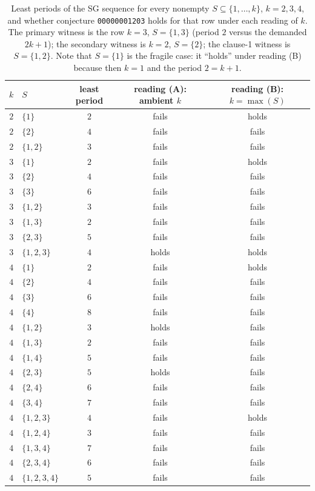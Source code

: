 \documentclass[11pt]{article}
\theoremstyle{definition}
\theoremstyle{remark}
\begin{document}
\begin{table}[htbp]
\centering
\small
\begin{tabular}{c l c c c}
\toprule
$k$ & $S$ & least period & reading (A): ambient $k$ & reading (B): $k=\max(S)$ \\
\midrule
$2$ & $\{1\}$       & $2$ & fails & holds \\
$2$ & $\{2\}$       & $4$ & fails & fails \\
$2$ & $\{1,2\}$     & $3$ & fails & fails \\
\midrule
$3$ & $\{1\}$       & $2$ & fails & holds \\
$3$ & $\{2\}$       & $4$ & fails & fails \\
$3$ & $\{3\}$       & $6$ & fails & fails \\
$3$ & $\{1,2\}$     & $3$ & fails & fails \\
$3$ & $\{1,3\}$     & $2$ & fails & fails \\
$3$ & $\{2,3\}$     & $5$ & fails & fails \\
$3$ & $\{1,2,3\}$   & $4$ & holds & holds \\
\midrule
$4$ & $\{1\}$       & $2$ & fails & holds \\
$4$ & $\{2\}$       & $4$ & fails & fails \\
$4$ & $\{3\}$       & $6$ & fails & fails \\
$4$ & $\{4\}$       & $8$ & fails & fails \\
$4$ & $\{1,2\}$     & $3$ & holds & fails \\
$4$ & $\{1,3\}$     & $2$ & fails & fails \\
$4$ & $\{1,4\}$     & $5$ & fails & fails \\
$4$ & $\{2,3\}$     & $5$ & holds & fails \\
$4$ & $\{2,4\}$     & $6$ & fails & fails \\
$4$ & $\{3,4\}$     & $7$ & fails & fails \\
$4$ & $\{1,2,3\}$   & $4$ & fails & holds \\
$4$ & $\{1,2,4\}$   & $3$ & fails & fails \\
$4$ & $\{1,3,4\}$   & $7$ & fails & fails \\
$4$ & $\{2,3,4\}$   & $6$ & fails & fails \\
$4$ & $\{1,2,3,4\}$ & $5$ & fails & fails \\
\bottomrule
\end{tabular}
\caption{Least periods of the SG sequence for every nonempty $S \subseteq
\{1,\dots,k\}$, $k = 2,3,4$, and whether conjecture \texttt{00000001203} holds
for that row under each reading of $k$. The primary witness is the row
$k=3$, $S=\{1,3\}$ (period $2$ versus the demanded $2k+1$); the secondary
witness is $k=2$, $S=\{2\}$; the clause-1 witness is $S=\{1,2\}$. Note that
$S=\{1\}$ is the fragile case: it ``holds'' under reading (B) because then
$k=1$ and the period $2 = k+1$.}
\label{tab:periods}
\end{table}
\end{document}
